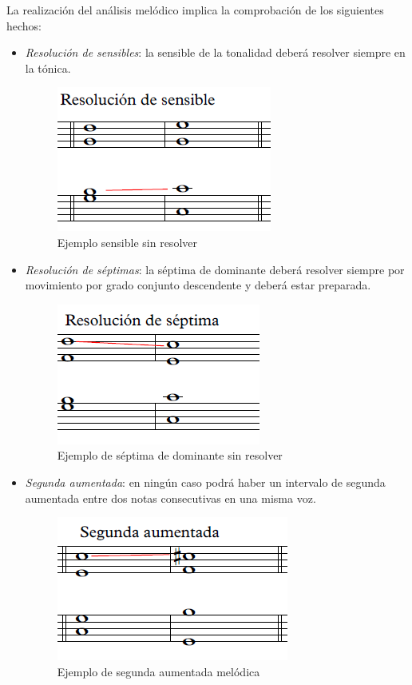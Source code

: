 \bigskip

La realización del análisis melódico implica la comprobación de los siguientes hechos:

\begin{itemize}

	\item \textit{Resolución de sensibles}: la sensible de la tonalidad deberá resolver siempre en la tónica.

	\begin{figure}[H]
		\centering
		\includegraphics[scale=0.7]{imagenes/sensibleres.png}
		\caption{Ejemplo sensible sin resolver}
		\label{fig2.1.8}
	\end{figure}

	\item \textit{Resolución de séptimas}: la séptima de dominante deberá resolver siempre por movimiento por grado conjunto descendente y deberá estar preparada.

	\begin{figure}[H]
		\centering
		\includegraphics[scale=0.7]{imagenes/septimares.png}
		\caption{Ejemplo de séptima de dominante sin resolver}
		\label{fig2.1.9}
	\end{figure}

	\item \textit{Segunda aumentada}: en ningún caso podrá haber un intervalo de segunda aumentada entre dos notas consecutivas en una misma voz.

	\begin{figure}[H]
		\centering
		\includegraphics[scale=0.7]{imagenes/2aumentada.png}
		\caption{Ejemplo de segunda aumentada melódica}
		\label{fig2.1.10}
	\end{figure}


\end{itemize}
